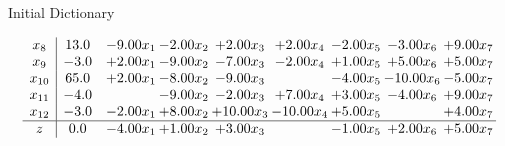 \documentclass[8pt]{article}
\begin{document}
Initial Dictionary 

\[\begin{array}{c| c c@{\hskip 2pt} c@{\hskip 2pt} c@{\hskip 2pt} c@{\hskip 2pt} c@{\hskip 2pt} c@{\hskip 2pt} c@{\hskip 2pt} }
 x_{8}   &  13.0 & -9.00 x_{1} & -2.00 x_{2} & +  2.00 x_{3} & +  2.00 x_{4} & -2.00 x_{5} & -3.00 x_{6} & +  9.00 x_{7}\\
 x_{9}   &  -3.0 & +  2.00 x_{1} & -9.00 x_{2} & -7.00 x_{3} & -2.00 x_{4} & +  1.00 x_{5} & +  5.00 x_{6} & +  5.00 x_{7}\\
 x_{10}   &  65.0 & +  2.00 x_{1} & -8.00 x_{2} & -9.00 x_{3} &   & -4.00 x_{5} & -10.00 x_{6} & -5.00 x_{7}\\
 x_{11}   &  -4.0  &   & -9.00 x_{2} & -2.00 x_{3} & +  7.00 x_{4} & +  3.00 x_{5} & -4.00 x_{6} & +  9.00 x_{7}\\
 x_{12}   &  -3.0 & -2.00 x_{1} & +  8.00 x_{2} & + 10.00 x_{3} & -10.00 x_{4} & +  5.00 x_{5} &   & +  4.00 x_{7}\\
\hline
z    &  0.0 & -4.00 x_{1} & +  1.00 x_{2} & +  3.00 x_{3} &   & -1.00 x_{5} & +  2.00 x_{6} & +  5.00 x_{7}\\
\end{array}\]
\end{document}
